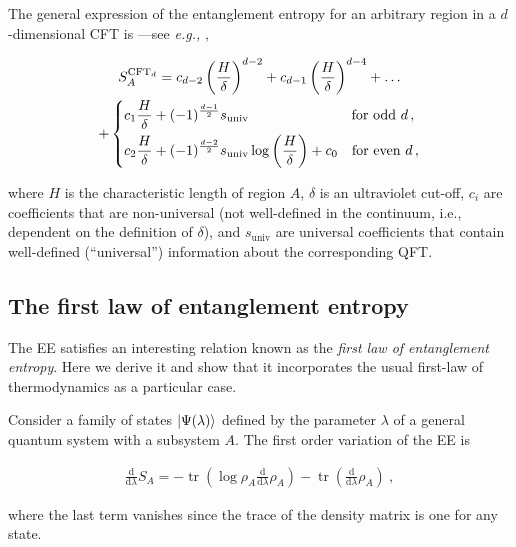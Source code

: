 \documentclass[twocolumn]{revtex4-2}
\providecommand{\eqgat}[2]{
    \begin{gather}
        #2
    \label{eq:#1}
    \end{gather}
}
\DeclareMathOperator{\tr}{tr}
\begin{document}
The general expression of the entanglement entropy for an arbitrary region in a $d$-dimensional CFT is ---see {\emph{e.g.,}} \cite{nishioka_entanglement_2018},
\eqgat{EE_CFT}{
    S_A^{\text{CFT}_d} = c_{d-2} \left( \frac{H}{\delta} \right) ^{d-2} + c_{d-1} \left( \frac{H}{\delta} \right) ^{d-4} + \dots  \\
    + \begin{dcases}
        c_1 \frac{H}{\delta} + (-1)^{\frac{d-1}{2}} s_{\text{univ}}
        \qquad \qquad \qquad \quad \ \text{for odd } d \, , \\
        c_2  \frac{H}{\delta} + (-1)^{\frac{d-2}{2}} s_{\text{univ}} \log \left ( \frac{H}{\delta} \right ) + c_0
        \quad \text{for even } d \, ,
    \end{dcases} \nonumber
}
where $H$ is the characteristic length of region $A$, $\delta$ is an ultraviolet cut-off, $c_i$ are coefficients that are non-universal (not well-defined in the continuum, i.e., dependent on the definition of $\delta$), and $s_{\text{univ}}$ are universal coefficients that contain well-defined (``universal'') information about the corresponding QFT.


\subsection{The first law of entanglement entropy}
The EE satisfies an interesting relation known as the 
\emph{first law of entanglement entropy}. %
Here we derive it and show that it incorporates the usual first-law of thermodynamics as a particular case.

Consider a family of states $\ket{\Psi(\lambda)}$ defined by the parameter $\lambda$ of a general quantum system with a subsystem $A$. The first order variation of the EE is \cite{van_raamsdonk_lectures_2017}
\eqgat{varEE}{
    \frac{\mathrm{d}}{\mathrm{d} \lambda} S_A %
    = - \tr \left( \log \rho_A \frac{\mathrm{d}}{\mathrm{d} \lambda} \rho_A \right) - \tr \left( \frac{\mathrm{d}}{\mathrm{d} \lambda} \rho_A \right) \ ,
}
where the last term vanishes since the trace of the density matrix is one for any state.
\end{document}
